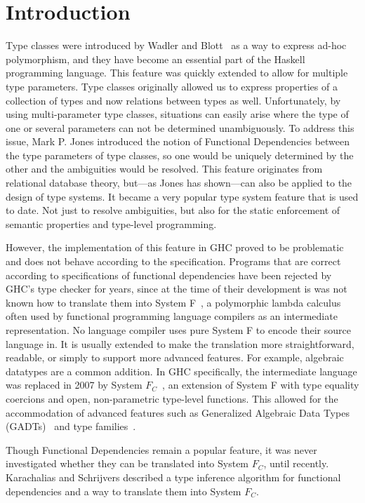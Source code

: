 \chapter{Introduction}
\label{cha:intro}
Type classes were introduced by Wadler and Blott~\cite{Wadler:1989:MAP:75277.75283}
as a
way to express ad-hoc polymorphism, and they have become an essential part of the Haskell
programming language. This feature was quickly extended to allow for multiple
type parameters. Type classes originally allowed us to express properties of a
collection of types and now relations between types as well. Unfortunately, by using
multi-parameter type classes, situations can easily arise where the type
of one or several parameters can not be determined unambiguously. To address this issue,
Mark P. Jones introduced the notion of Functional Dependencies
\cite{Jones00typeclasses} between the type parameters of type classes, so one
would be uniquely determined by the other and the ambiguities would be resolved.
This feature originates from relational database theory, but---as Jones has shown---can also be applied to
the design of type systems. It became a very popular type system feature that is
used to date. Not just to resolve ambiguities, but also for the
static enforcement of semantic properties and type-level programming.

However, the implementation of this feature in GHC proved to be problematic and
does not behave according to the specification. Programs that are correct according
to specifications of functional dependencies
have been rejected by GHC's type checker for years, since at the time of their development is was not known how to translate them into System
F~\cite{systemf},
a polymorphic
lambda calculus often used by functional programming language compilers as an
intermediate representation. No language compiler uses pure System F to encode
their source language in. It is usually extended to make the translation more
straightforward, readable, or simply to support more advanced features. For
example, algebraic datatypes are a common addition. In GHC specifically, the intermediate language was replaced in 2007
by System $F_C$~\cite{Sulzmann:2007:SFT:1190315.1190324}, an extension of
System F with type equality coercions and open, non-parametric type-level
functions. This allowed for the accommodation of advanced features such as
Generalized Algebraic Data Types (GADTs)~\cite{PeytonJones06} and type
families~\cite{AssociatedTypeSynonyms}.

Though Functional Dependencies remain a popular feature, it was never
investigated whether they can be translated into System $F_C$, until
recently. Karachalias and Schrijvers \cite{Karachalias:2017:EFD:3156695.3122966}
described a type inference algorithm for functional dependencies and a way to
translate them into System $F_C$.

